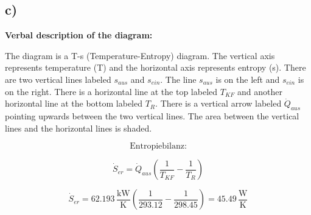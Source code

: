 

\subsection*{c)}

\textbf{Verbal description of the diagram:}

The diagram is a T-s (Temperature-Entropy) diagram. The vertical axis represents temperature (T) and the horizontal axis represents entropy (s). There are two vertical lines labeled \( s_{aus} \) and \( s_{ein} \). The line \( s_{aus} \) is on the left and \( s_{ein} \) is on the right. There is a horizontal line at the top labeled \( T_{KF} \) and another horizontal line at the bottom labeled \( T_R \). There is a vertical arrow labeled \( \dot{Q}_{aus} \) pointing upwards between the two vertical lines. The area between the vertical lines and the horizontal lines is shaded.

\[
\text{Entropiebilanz:}
\]

\[
\dot{S}_{er} = \dot{Q}_{aus} \left( \frac{1}{T_{KF}} - \frac{1}{T_R} \right)
\]

\[
\dot{S}_{er} = 62.193 \, \frac{\text{kW}}{\text{K}} \left( \frac{1}{293.12} - \frac{1}{298.45} \right) = 45.49 \, \frac{\text{W}}{\text{K}}
\]